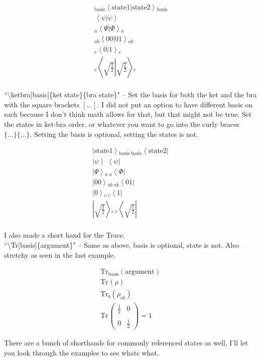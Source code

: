 \documentclass[12pt]{article}
\newcommand{\ket}[2][]{\left|#2\right\rangle\!{}_{#1}}
\newcommand{\bra}[2][]{\,{}_{#1}\!\left\langle#2\right|}
\newcommand{\braket}[3][]{\,{}_{#1}\!\left\langle#2\left|#3\right.\right\rangle\!{}_{#1}}
\newcommand{\ketbra}[3][]{\ket[#1]{#2}\bra[#1]{#3}}
\newcommand{\Tr}[2][]{\text{Tr}_{#1}\left(#2\right)}
\begin{document}
\begin{align*}
\braket[\text{basis}]{\text{state1}}{\text{state2}} \\
\braket{\psi}{\psi} \\
\braket[a]{\Psi}{\Phi} \\
\braket[ab]{00}{01}\\
\braket[c]{0}{1} \\
\braket[c]{\sqrt{\frac{1}{2}}}{\sqrt{\frac{1}{2}}} \\
\end{align*}

``\textbackslash ketbra[basis]\{ket state\}\{bra state\}" -- Set the basis for both the ket and the bra with the square brackets $[\dots]$. I did not put an option to have different basis on each because I don't think math allows for that, but that might not be true.  Set the states in ket-bra order, or whatever you want to go into the curly braces $\{\dots\}\{\dots\}$.  Setting the basis is optional, setting the states is not.

\begin{align*}
\ketbra[\text{basis}]{\text{state1}}{\text{state2}} \\
\ketbra{\psi}{\psi} \\
\ketbra[a]{\Psi}{\Phi} \\
\ketbra[ab]{00}{01}\\
\ketbra[c]{0}{1} \\
\ketbra[c]{\sqrt{\frac{1}{2}}}{\sqrt{\frac{1}{2}}} \\
\end{align*}

\newpage

I also made a short hand for the Trace. \\
``\textbackslash Tr[basis]\{argument\}" -- Same as above, basis is optional, state is not.  Also stretchy as seen in the last example.

\begin{align*}
\Tr[\text{basis}]{\text{argument}}\\
\Tr{\rho} \\ 
\Tr[b]{\rho_{ab}} \\
\Tr{\begin{array}{cc} \frac{1}{2} & 0 \\\\ 0 & \frac{1}{2} \end{array}} = 1
\end{align*}

\newpage

There are a bunch of shorthands for commonly referenced states as well, I'll let you look through the examples to see whats what.
\end{document}
